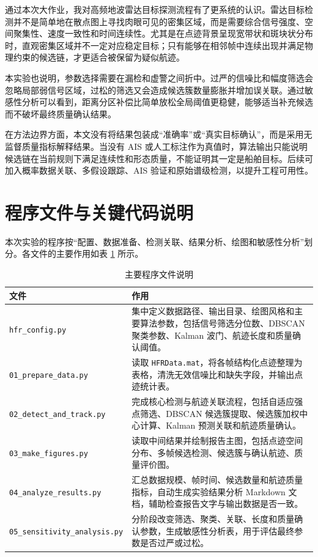 \documentclass[UTF8,a4paper,12pt]{ctexart}
\numberwithin{figure}{section}
\numberwithin{table}{section}
\begin{document}
通过本次大作业，我对高频地波雷达目标探测流程有了更系统的认识。雷达目标检测并不是简单地在散点图上寻找肉眼可见的密集区域，而是需要综合信号强度、空间聚集性、速度一致性和时间连续性。尤其是在点迹背景呈现宽带状和斑块状分布时，直观密集区域并不一定对应稳定目标；只有能够在相邻帧中连续出现并满足物理约束的候选链，才更适合被保留为疑似航迹。

本实验也说明，参数选择需要在漏检和虚警之间折中。过严的信噪比和幅度筛选会忽略局部弱信号区域，过松的筛选又会造成候选簇数量膨胀并增加误关联。通过敏感性分析可以看到，距离分区补偿比简单放松全局阈值更稳健，能够适当补充候选而不破坏最终质量确认结果。

在方法边界方面，本文没有将结果包装成“准确率”或“真实目标确认”，而是采用无监督质量指标解释结果。当没有 AIS 或人工标注作为真值时，算法输出只能说明候选链在当前规则下满足连续性和形态质量，不能证明其一定是船舶目标。后续可加入概率数据关联、多假设跟踪、AIS 验证和原始谱级检测，以提升工程可用性。

\appendix
\section{程序文件与关键代码说明}

本次实验的程序按“配置、数据准备、检测关联、结果分析、绘图和敏感性分析”划分。各文件的主要作用如表 \ref{tab:code_files} 所示。

\begin{table}[H]
  \centering
  \caption{主要程序文件说明}
  \label{tab:code_files}
  \small
  \begin{tabularx}{\textwidth}{lX}
    \toprule
    文件 & 作用 \\
    \midrule
    \texttt{hfr\_config.py} & 集中定义数据路径、输出目录、绘图风格和主要算法参数，包括信号筛选分位数、DBSCAN 聚类参数、Kalman 波门、航迹长度和质量确认阈值。 \\
    \texttt{01\_prepare\_data.py} & 读取 \texttt{HFRData.mat}，将各帧结构化点迹整理为表格，清洗无效信噪比和缺失字段，并输出点迹统计表。 \\
    \texttt{02\_detect\_and\_track.py} & 完成核心检测与航迹关联流程，包括自适应强点筛选、DBSCAN 候选簇提取、候选簇加权中心计算、Kalman 预测关联和航迹质量确认。 \\
    \texttt{03\_make\_figures.py} & 读取中间结果并绘制报告主图，包括点迹空间分布、多帧候选检测、候选簇与确认航迹、质量评价图。 \\
    \texttt{04\_analyze\_results.py} & 汇总数据规模、帧时间、候选数量和航迹质量指标，自动生成实验结果分析 Markdown 文档，辅助检查报告文字与输出数据是否一致。 \\
    \texttt{05\_sensitivity\_analysis.py} & 分阶段改变筛选、聚类、关联、长度和质量确认参数，生成敏感性分析表，用于评估最终参数是否过严或过松。 \\
    \bottomrule
  \end{tabularx}
\end{table}
\end{document}
